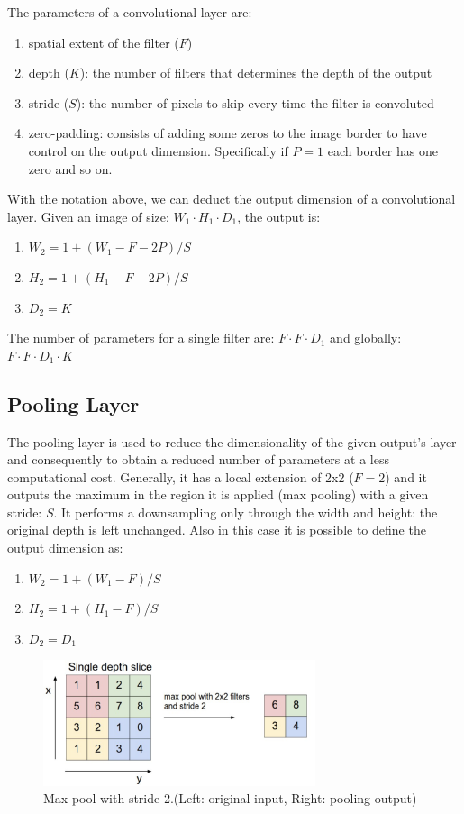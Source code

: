 \documentclass[LaM,binding=0.6cm]{sapthesis}
\begin{document}
The parameters of a convolutional layer are:
\begin{enumerate}
\item spatial extent of the filter ($F$)
\item depth ($K$): the number of filters that determines the depth of the output
\item stride ($S$): the number of pixels to skip every time the filter is convoluted
\item zero-padding: consists of adding some zeros to the image border to have control on the output dimension. Specifically if $P=1$ each border has one zero and so on.
\end{enumerate}
With the notation above, we can deduct the output dimension of a convolutional layer. Given an image of size: $W_1 \cdot H_1 \cdot D_1$, the output is:
\begin{enumerate}
\item $W_2 = 1+(W_1-F-2P)/S$
\item $H_2 = 1+(H_1-F-2P)/S$
\item $D_2 = K$
\end{enumerate} 
The number of parameters for a single filter are: $F\cdot F\cdot D_1$ and globally: $F\cdot F\cdot D_1\cdot K$
\subsection{Pooling Layer}
The pooling layer is used to reduce the dimensionality of the given output's layer and consequently to obtain a reduced number of parameters at a less computational cost. Generally, it has a local extension of 2x2 ($F=2$) and it outputs the maximum in the region it is applied (max pooling) with a given stride: $S$. It performs a downsampling only through the width and height: the original depth is left unchanged. Also in this case it is possible to define the output dimension as:
\begin{enumerate}
\item $W_2 = 1+(W_1-F)/S$
\item $H_2 = 1+(H_1-F)/S$
\item $D_2 = D_1$
\end{enumerate} 
\begin{figure}   \centering
    \includegraphics[width=80mm,scale=0.7]{pool}
    \caption{Max pool with stride 2.(Left: original input, Right: pooling output) \cite{cnnsite}}
    \label{fig:pool}
\end{figure}
\end{document}
